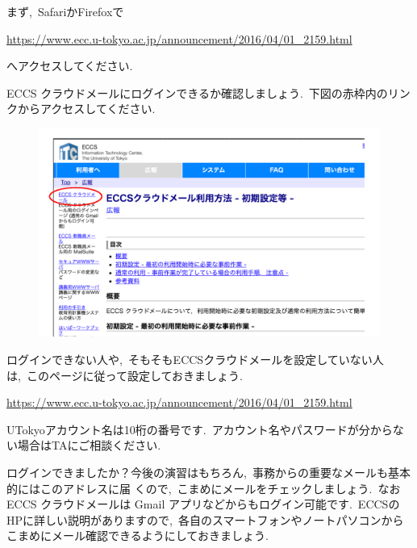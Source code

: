 \documentclass{jarticle}
\begin{document}
まず,\ SafariかFirefoxで
\begin{center}
 \href{https://www.ecc.u-tokyo.ac.jp/announcement/2016/04/01_2159.html}{https://www.ecc.u-tokyo.ac.jp/announcement/2016/04/01\_2159.html}
\end{center}
へアクセスしてください.\ 

ECCS クラウドメールにログインできるか確認しましょう.\ 下図の赤枠内のリンクからアクセスしてください.
\begin{figure}[H]
  \begin{center}
     \includegraphics[width=150mm,pagebox=cropbox,clip]{fig/eccs.png}
  \end{center}
\end{figure}

ログインできない人や,\ そもそもECCSクラウドメールを設定していない人は,\ このページに従って設定しておきましょう.\ 
\begin{center}
  \href{https://www.ecc.u-tokyo.ac.jp/announcement/2016/04/01\_2159.html}{https://www.ecc.u-tokyo.ac.jp/announcement/2016/04/01\_2159.html}
\end{center}

UTokyoアカウント名は10桁の番号です.\ アカウント名やパスワードが分からない場合はTAにご相談ください.\ 

\vspace{1em}

ログインできましたか？今後の演習はもちろん,\ 事務からの重要なメールも基本的にはこのアドレスに届
 くので,\ こまめにメールをチェックしましょう.\ なお ECCS クラウドメールは Gmail アプリなどからもログイン可能です.\ ECCSのHPに詳しい説明がありますので,\ 各自のスマートフォンやノートパソコンからこまめにメール確認できるようにしておきましょう.\ 
\end{document}
